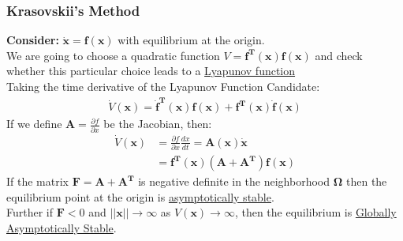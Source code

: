 \documentclass[11pt,handout]{beamer}   %
\begin{document}
\begin{frame}
\frametitle{Krasovskii's Method}
\small
\textbf{Consider:} $\mathbf{\dot{x} = f(x)}$ with equilibrium at the origin.\\
\vspace{6pt}
We are going to choose a quadratic function $V = \mathbf{f^T(x) f(x)}$ and check whether this particular choice leads to a \underline
{Lyapunov function}\\
\vspace{6pt}
Taking the time derivative of the Lyapunov Function Candidate:
\begin{equation*}
\begin{aligned}
\dot{V}(\mathbf{x}) = \mathbf{\dot{f}^T(x)f(x)} + \mathbf{f^T(x)\dot{f}(x)}
\end{aligned}
\end{equation*}
If we define $\mathbf{A} = \frac{\partial f}{\partial x}$ be the Jacobian, then:
\begin{equation*}
\begin{aligned}
\dot{V}(\mathbf{x}) &= \frac{\partial f}{\partial x} \frac{dx}{dt} = \mathbf{A}(\mathbf{x})\dot{\mathbf{x}}\\
&= \mathbf{f^T(x)(A+A^T)f(x)}
\end{aligned}
\end{equation*}
If the matrix $\mathbf{F = A+A^T}$ is negative definite in the neighborhood $\mathbf{\Omega}$ then the equilibrium point at the origin is \underline{asymptotically stable}.\\
\vspace{6pt}
Further if $\mathbf{F}<0$ and $||\mathbf{x}|| \rightarrow \infty
$ as $V(\mathbf{x}) \rightarrow \infty$, then the equilibrium is \underline{Globally Asymptotically Stable}.
\end{frame}
\end{document}
